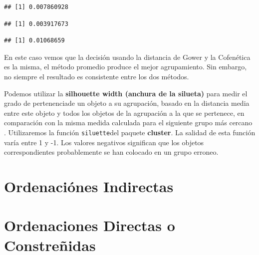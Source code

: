 \documentclass[]{book}
\begin{document}
\begin{verbatim}
## [1] 0.007860928
\end{verbatim}

\begin{verbatim}
## [1] 0.003917673
\end{verbatim}

\begin{verbatim}
## [1] 0.01068659
\end{verbatim}

En este caso vemos que la decisión usando la distancia de Gower y la
Cofenética es la misma, el método promedio produce el mejor
agrupamiento. Sin embargo, no siempre el resultado es consistente entre
los dos métodos.

Podemos utilizar la \textbf{silhouette width (anchura de la silueta)}
para medir el grado de pertenenciade un objeto a su agrupación, basado
en la distancia media entre este objeto y todos los objetos de la
agrupación a la que se pertenece, en comparación con la misma medida
calculada para el siguiente grupo más cercano \citep{Borcard2011}.
Utilizaremos la función \texttt{siluette}del paquete \textbf{cluster}.
La salidad de esta función varía entre 1 y -1. Los valores negativos
significan que los objetos correspondientes probablemente se han
colocado en un grupo erroneo.

\chapter{Ordenaciónes Indirectas}\label{ordenaciones-indirectas}

\chapter{Ordenaciones Directas o
Constreñidas}\label{ordenaciones-directas-o-constrenidas}


\end{document}
